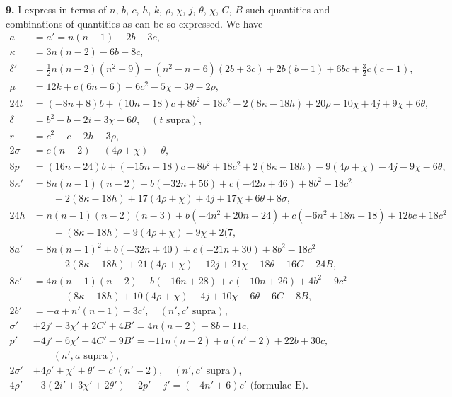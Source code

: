 \documentclass[11pt,a4paper]{article}
\begin{document}
\textbf{9.} I express in terms of $n$, $b$, $c$, $h$, $k$, $\rho$, $\chi$, $j$, $\theta$, $\chi$, $C$, $B$ such quantities and combinations of quantities as can be so expressed. We have
\begin{align*}
a &= a' = n(n-1) - 2b - 3c, \\
\kappa &= 3n(n-2) - 6b - 8c, \\
\delta' &= \tfrac{1}{2}n(n-2)(n^2-9) - (n^2-n-6)(2b+3c) + 2b(b-1) + 6bc + \tfrac{3}{2}c(c-1), \\
\mu &= 12k + c(6n-6) - 6c^2 - 5\chi + 3\theta - 2\rho, \\
24t &= (-8n+8)b + (10n-18)c + 8b^2 - 18c^2 - 2(8\kappa-18h) + 20\rho - 10\chi + 4j + 9\chi + 6\theta, \\
\delta &= b^2 - b - 2i - 3\chi - 6\theta, \quad (t \text{ supra}), \\
r &= c^2 - c - 2h - 3\rho, \\
2\sigma &= c(n-2) - (4\rho + \chi) - \theta, \\
8p &= (16n-24)b + (-15n+18)c - 8b^2 + 18c^2 + 2(8\kappa-18h) - 9(4\rho+\chi) - 4j - 9\chi - 6\theta, \\
8\kappa' &= 8n(n-1)(n-2) + b(-32n+56) + c(-42n+46) + 8b^2 - 18c^2 \\
       &\qquad - 2(8\kappa-18h) + 17(4\rho+\chi) + 4j + 17\chi + 6\theta + 8\sigma, \\
24h &= n(n-1)(n-2)(n-3) + b(-4n^2+20n-24) + c(-6n^2+18n-18) + 12bc + 18c^2 \\
    &\qquad + (8\kappa-18h) - 9(4\rho+\chi) - 9\chi + 2(7, \\
8a' &= 8n(n-1)^2 + b(-32n+40) + c(-21n+30) + 8b^2 - 18c^2 \\
    &\qquad - 2(8\kappa-18h) + 21(4\rho+\chi) - 12j + 21\chi - 18\theta - 16C - 24B, \\
8c' &= 4n(n-1)(n-2) + b(-16n+28) + c(-10n+26) + 4b^2 - 9c^2 \\
    &\qquad - (8\kappa-18h) + 10(4\rho+\chi) - 4j + 10\chi - 6\theta - 6C - 8B, \\
2b' &= -a + n'(n-1) - 3c', \quad (n', c' \text{ supra}), \\
\sigma' &+ 2j' + 3\chi' + 2C' + 4B' = 4n(n-2) - 8b - 11c, \\
p' &- 4j' - 6\chi' - 4C' - 9B' = -11n(n-2) + a(n'-2) + 22b + 30c, \\
       &\qquad (n', a \text{ supra}), \\
2\sigma' &+ 4\rho' + \chi' + \theta' = c'(n'-2), \quad (n', c' \text{ supra}), \\
4\rho' &- 3(2i' + 3\chi' + 2\theta') - 2p' - j' = (-4n'+6)c' \text{ (formulae E).}
\end{align*}
\end{document}
